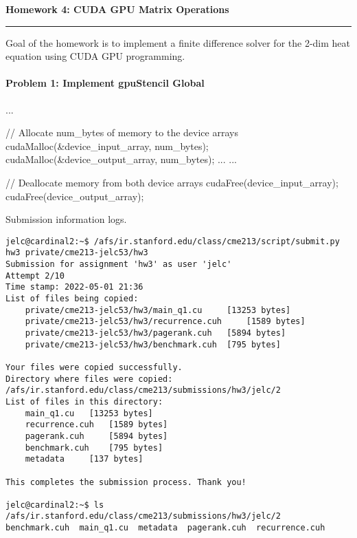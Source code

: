 \documentclass[12pt,letterpaper,twoside]{article}
\begin{document}
{\centering \textbf{Homework 4: CUDA GPU Matrix Operations\\}}
\vspace*{-8pt}\noindent\rule{\linewidth}{1pt}

Goal of the homework is to implement a finite difference solver for the
2-dim heat equation using CUDA GPU programming.

\paragraph{Problem 1: Implement gpuStencil Global } ...

\begin{cpp}
// Allocate num_bytes of memory to the device arrays
cudaMalloc(&device_input_array, num_bytes);
cudaMalloc(&device_output_array, num_bytes);
...
...

// Deallocate memory from both device arrays
cudaFree(device_input_array);
cudaFree(device_output_array);
\end{cpp}


Submission information logs.
\begin{verbatim}
jelc@cardinal2:~$ /afs/ir.stanford.edu/class/cme213/script/submit.py hw3 private/cme213-jelc53/hw3
Submission for assignment 'hw3' as user 'jelc'
Attempt 2/10
Time stamp: 2022-05-01 21:36
List of files being copied:
    private/cme213-jelc53/hw3/main_q1.cu	 [13253 bytes]
    private/cme213-jelc53/hw3/recurrence.cuh	 [1589 bytes]
    private/cme213-jelc53/hw3/pagerank.cuh	 [5894 bytes]
    private/cme213-jelc53/hw3/benchmark.cuh	 [795 bytes]

Your files were copied successfully.
Directory where files were copied: /afs/ir.stanford.edu/class/cme213/submissions/hw3/jelc/2
List of files in this directory:
    main_q1.cu	 [13253 bytes]
    recurrence.cuh	 [1589 bytes]
    pagerank.cuh	 [5894 bytes]
    benchmark.cuh	 [795 bytes]
    metadata	 [137 bytes]

This completes the submission process. Thank you!
    
jelc@cardinal2:~$ ls /afs/ir.stanford.edu/class/cme213/submissions/hw3/jelc/2
benchmark.cuh  main_q1.cu  metadata  pagerank.cuh  recurrence.cuh
\end{verbatim}
\end{document}

